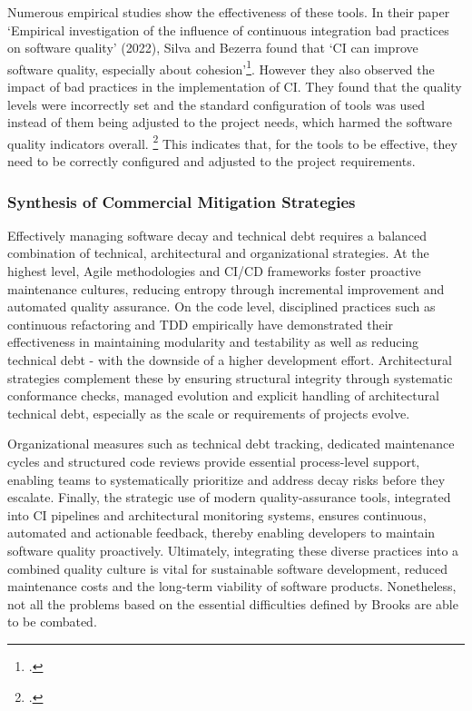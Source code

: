 Numerous empirical studies show the effectiveness of these tools. In their paper `Empirical investigation of the influence of continuous integration bad practices on software quality' (2022),
Silva and Bezerra found that `CI can improve software quality, especially about cohesion'\footcite[4]{silvaEmpiricalInvestigationInfluence2022}. However they also observed the impact
of bad practices in the implementation of CI. They found that the quality levels were incorrectly set and the standard configuration of tools was used instead of them being adjusted to the project needs, which harmed the software quality indicators overall. \footcite[4]{silvaEmpiricalInvestigationInfluence2022}
This indicates that, for the tools to be effective, they need to be correctly configured and adjusted to the project requirements.

\subsubsection{Synthesis of Commercial Mitigation Strategies}
Effectively managing software decay and technical debt requires a balanced combination of technical, architectural and organizational strategies.
At the highest level, Agile methodologies and \ac{CI/CD} frameworks foster proactive maintenance cultures, reducing entropy through incremental improvement
and automated quality assurance. On the code level, disciplined practices such as continuous refactoring and \ac{TDD} empirically have demonstrated their effectiveness
in maintaining modularity and testability as well as reducing technical debt - with the downside of a higher development effort. Architectural strategies complement these
by ensuring structural integrity through systematic conformance checks, managed evolution and explicit handling of architectural technical debt, especially as
the scale or requirements of projects evolve.

Organizational measures such as technical debt tracking, dedicated maintenance cycles and structured code reviews provide essential process-level support,
enabling teams to systematically prioritize and address decay risks before they escalate. Finally, the strategic use of modern quality-assurance tools, integrated
into \ac{CI} pipelines and architectural monitoring systems, ensures continuous, automated and actionable feedback, thereby enabling developers to maintain
software quality proactively. Ultimately, integrating these diverse practices into a combined quality culture is vital for sustainable software development,
reduced maintenance costs and the long-term viability of software products. Nonetheless, not all the problems based on the essential difficulties defined by Brooks are able to be combated.

